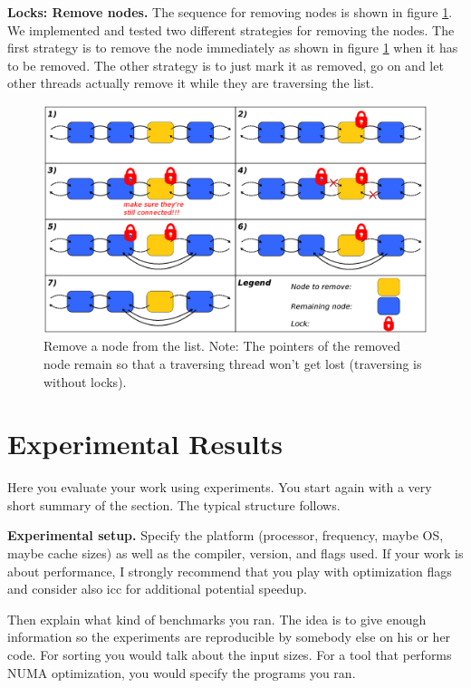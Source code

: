 \documentclass[letterpaper]{article}
\newcommand{\mypar}[1]{{\bf #1.}}
\begin{document}
\mypar{Locks: Remove nodes}
The sequence for removing nodes is shown in  figure \ref{fig:remove}.\\
We implemented and tested two different strategies for removing the nodes. The first strategy is to remove the node immediately as shown in figure \ref{fig:remove} when it has to be removed. The other strategy is to just mark it as removed, go on and let other threads actually remove it while they are traversing the list.

\begin{figure}[h]\centering
  \includegraphics[scale=0.31]{remove.eps}
  \caption{Remove a node from the list. Note: The pointers of the removed node remain so that a traversing thread won't get lost (traversing is without locks). \label{fig:remove}}
\end{figure}



\section{Experimental Results}\label{sec:exp}

Here you evaluate your work using experiments. You start again with a
very short summary of the section. The typical structure follows.

\mypar{Experimental setup} Specify the platform (processor, frequency, maybe OS, maybe cache sizes)
as well as the compiler, version, and flags used. If your work is about performance, 
I strongly recommend that you play with optimization flags and consider also icc for additional potential speedup.

Then explain what kind of benchmarks you ran. The idea is to give enough information so the experiments are reproducible by somebody else on his or her code.
For sorting you would talk about the input sizes. For a tool that performs NUMA optimization, you would specify the programs you ran.
\end{document}
